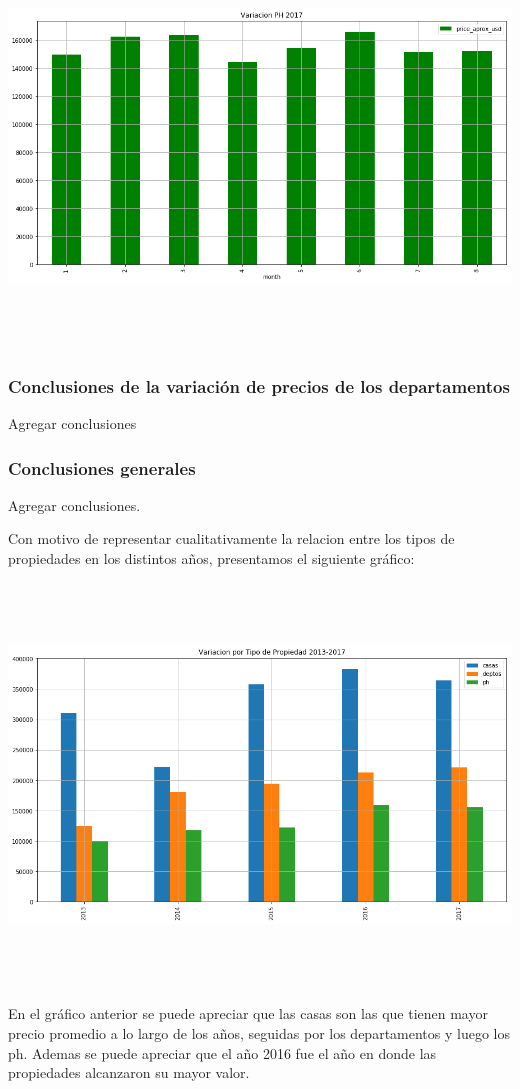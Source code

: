 \documentclass[a4paper, 10pt]{article}
\begin{document}
      \begin{center}
            \includegraphics[width=6in, height=4.2in]{images/vPH2017}
      \end{center}

      \subsubsection{Conclusiones de la variación de precios de los departamentos}

      Agregar conclusiones

      \subsubsection{Conclusiones generales}

      Agregar conclusiones.

      Con motivo de representar cualitativamente la relacion entre los tipos de propiedades en los distintos años,
      presentamos el siguiente gráfico:

      \begin{center}
            \includegraphics[width=6in, height=4.2in]{images/vTipoProp}
      \end{center}

      En el gráfico anterior se puede apreciar que las casas son las que tienen mayor precio promedio
      a lo largo de los años, seguidas por los departamentos y luego los ph.
      Ademas se puede apreciar que el año 2016 fue el año en donde las propiedades alcanzaron su mayor valor.
\end{document}
